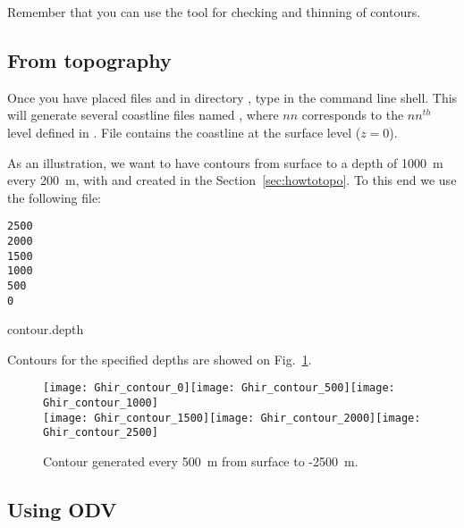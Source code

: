 Remember that you can use the tool  for checking and thinning of contours.


\subsection{From topography\label{sec:contourtopo}}


Once you have placed files  and  in directory , type  in the command line shell. This will generate several coastline files named , where $nn$ corresponds to the $nn^{th}$ level defined in . File  contains the coastline at the surface level ($z=0$).

As an illustration, we want to have contours from surface to a depth of \mbox{1000 m} every \mbox{200 m}, with  and  created in the Section~\ref{sec:howtotopo}. To this end we use the following file:

\begin{exfile}[htpb]
\begin{footnotesize}
\begin{verbatim}
2500
2000
1500
1000
500
0
\end{verbatim}
\end{footnotesize}
\caption{contour.depth\label{contourdepth}}
\end{exfile}

Contours for the specified depths are showed on Fig.~\ref{fig:contourdepth}.


\begin{figure}[htpb]
\centering
\texttt{[image: Ghir\_contour\_0]}\texttt{[image: Ghir\_contour\_500]}\texttt{[image: Ghir\_contour\_1000]}\\
\texttt{[image: Ghir\_contour\_1500]}\texttt{[image: Ghir\_contour\_2000]}\texttt{[image: Ghir\_contour\_2500]}

\caption{Contour generated every 500~m from surface to -2500~m.\label{fig:contourdepth}}
\end{figure}

\subsection{Using ODV}

